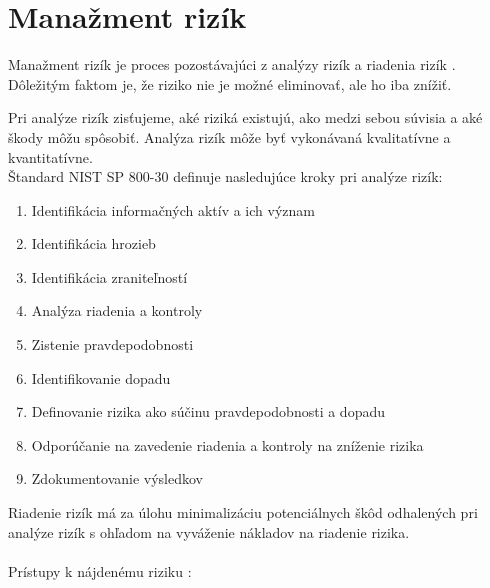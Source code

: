 \section{Manažment rizík}
\label{riskmanagement}
Manažment rizík je proces pozostávajúci z analýzy rizík a riadenia rizík \cite{McMillan2018}. Dôležitým faktom je, že riziko nie je možné eliminovať, ale ho iba znížiť.

Pri analýze rizík zisťujeme, aké riziká existujú, ako medzi sebou súvisia a aké škody môžu spôsobiť. Analýza rizík môže byť vykonávaná kvalitatívne a kvantitatívne.\\ 
\newpage
\noindent
Štandard NIST SP 800-30 \cite{7TVhmfuQFbsOANAz} definuje nasledujúce kroky pri analýze rizík:

\begin{enumerate}
	\item Identifikácia informačných aktív a ich význam
	\item Identifikácia hrozieb
	\item Identifikácia zraniteľností
	\item Analýza riadenia a kontroly 
	\item Zistenie pravdepodobnosti
	\item Identifikovanie dopadu
	\item Definovanie rizika ako súčinu pravdepodobnosti a dopadu
	\item Odporúčanie na zavedenie riadenia a kontroly na zníženie rizika  
	\item Zdokumentovanie výsledkov
\end{enumerate} 
\vspace{2em}
Riadenie rizík má za úlohu minimalizáciu potenciálnych škôd odhalených pri analýze rizík s ohľadom na vyváženie nákladov na riadenie rizika. 
\\\\
\noindent
Prístupy k nájdenému riziku \cite{Vyncke2008}\cite{McMillan2018}\cite{Jackson2010}:
